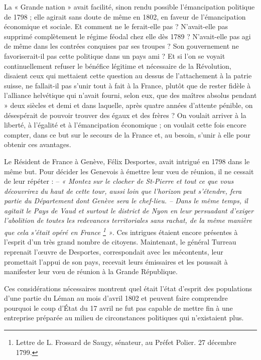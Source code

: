\documentclass[french,twoside]{book} %
\newcommand\chapterclose{} %
\begin{document}
La « Grande nation » avait facilité, sinon rendu possible l’émancipation politique de 1798 ; elle agirait sans doute de même en 1802, en faveur de l’émancipation économique et sociale. Et comment ne le ferait-elle pas ? N’avait-elle pas supprimé complètement le régime féodal chez elle dès 1789 ? N’avait-elle pas agi de même dans les contrées conquises par ses troupes ? Son gouvernement ne favoriserait-il pas cette politique dans un pays ami ? Et si l’on se voyait continuellement refuser le bénéfice légitime et nécessaire de la Révolution, disaient ceux qui mettaient cette question au dessus de l’attachement à la patrie suisse, ne fallait-il pas s’unir tout à fait à la France, plutôt que de rester fidèle à l’alliance helvétique qui n’avait fourni, selon eux, que des maîtres absolus pendant » deux siècles et demi et dans laquelle, après quatre années d’attente pénible, on désespérait de pouvoir trouver des égaux et des frères ? On voulait arriver à la liberté, à l’égalité et à l’émancipation économique ; on voulait cette fois encore compter, dans ce but sur le secours de la France et, au besoin, s’unir à elle pour obtenir ces avantages.\par
Le Résident de France à Genève, Félix Desportes, avait intrigué en 1798 dans le même but. Pour décider les Genevois à émettre leur vœu de réunion, il ne cessait de leur répéter : – \emph{« Montez sur le clocher de St-Pierre et tout ce que vous découvrirez du haut de cette tour, aussi loin que l’horizon peut s’étendre, fera partie du Département dont Genève sera le chef-lieu. – Dans le même temps, il agitait le Pays de Vaud et surtout le district de Nyon en leur persuadant d’exiger l’abolition de toutes les redevances territoriales sans rachat, de la même manière que cela s’était opéré en France \footnote{Lettre de L. Frossard de Saugy, sénateur, au Préfet Polier. 27 décembre 1799.} »}. Ces intrigues étaient encore présentes à l’esprit d’un très grand nombre de citoyens. Maintenant, le général Turreau reprenait l’œuvre de Desportes, correspondait avec les mécontents, leur promettait l’appui de son pays, recevait leurs émissaires et les poussait à manifester leur vœu de réunion à la Grande République.\par
Ces considérations nécessaires montrent quel était l’état d’esprit des populations d’une partie du Léman au mois d’avril 1802 et peuvent faire comprendre pourquoi le coup d’État du 17 avril ne fut pas capable de mettre fin à une entreprise préparée au milieu de circonstances politiques qui n’existaient plus.
\chapterclose
\end{document}
